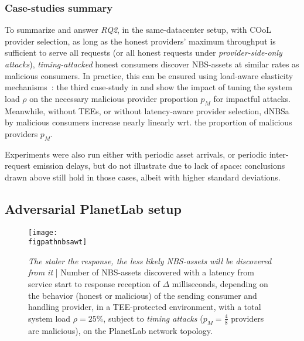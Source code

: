 \subsubsection{Case-studies summary}
To summarize and answer \emph{RQ2}, in the same-datacenter setup, with COoL provider selection, as long as the honest providers' maximum throughput is sufficient to serve all requests (or all honest requests under \emph{provider-side-only attacks}), \emph{timing-attacked} honest consumers discover NBS-assets at similar rates as malicious consumers.
In practice, this can be ensured using load-aware elasticity mechanisms~\cite{HorizontalPodAutoscaling}: the third case-study in  and  show the impact of tuning the system load $\rho$ on the necessary malicious provider proportion $p_{M}$ for impactful attacks.
Meanwhile, without TEEs, or without latency-aware provider selection, dNBSa by malicious consumers increase nearly linearly wrt. the proportion of malicious providers $p_{M}$.

Experiments were also run either with periodic asset arrivals, or periodic inter-request emission delays, but do not illustrate due to lack of space: conclusions drawn above still hold in those cases, albeit with higher standard deviations. 

\subsection{Adversarial PlanetLab setup}\label{ssec:res-malPL}

\begin{figure}
    \centering
    \texttt{[image: \\figpathnbsawt]}
    \caption{\emph{The staler the response, the less likely NBS-assets will be discovered from it} | Number of NBS-assets discovered with a latency from service start to response reception of $\Delta$ milliseconds, depending on the behavior (honest or malicious) of the sending consumer and handling provider, in a TEE-protected environment, with a total system load $\rho=25\%$, subject to \emph{timing attacks} ($p_{M}=\frac{4}{8}$ providers are malicious), on the PlanetLab network topology.}
    \label{fig:nbsa-wt}
\end{figure}

